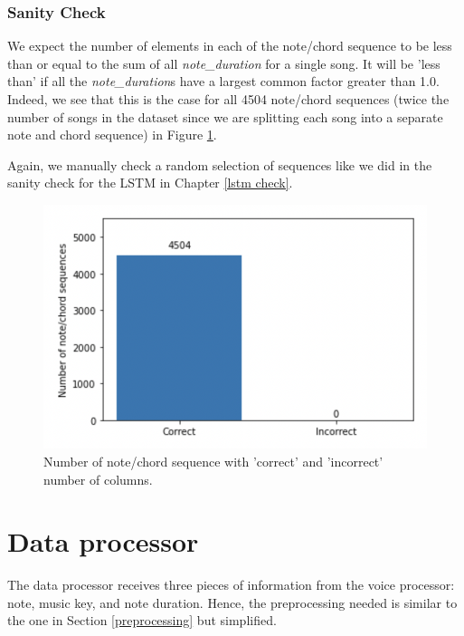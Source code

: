 \subsubsection{Sanity Check}
We expect the number of elements in each of the note/chord sequence to be less than or equal to the sum of all \emph{note\_duration} for a single song. It will be 'less than' if all the \emph{note\_duration}s have a largest common factor greater than 1.0. Indeed, we see that this is the case for all 4504 note/chord sequences (twice the number of songs in the dataset since we are splitting each song into a separate note and chord sequence) in Figure \ref{fig:Transformer check}.

Again, we manually check a random selection of sequences like we did in the sanity check for the LSTM in Chapter \ref{lstm check}.

\begin{figure}
    \centering
    \includegraphics{Figures/Transformer check}
    \decoRule
    \caption{Number of note/chord sequence with 'correct' and 'incorrect' number of columns.}
    \label{fig:Transformer check}
    \end{figure}


\section{Data processor}
\label{data processor}
The data processor receives three pieces of information from the voice processor: note, music key, and note duration. Hence, the preprocessing needed is similar to the one in Section \ref{preprocessing} but simplified.

